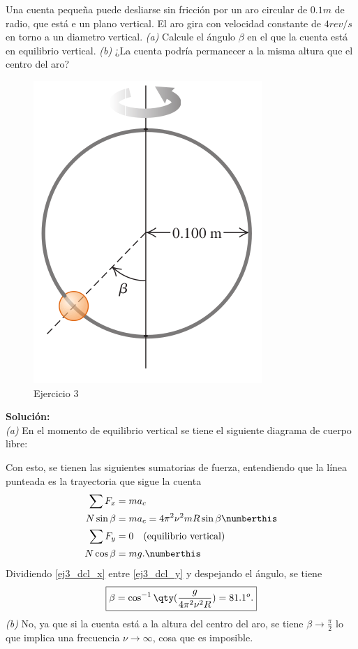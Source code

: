 \begin{mdframed}[style=warning]
	\begin{ejercicio}
		Una cuenta pequeña puede desliarse sin fricción por un aro circular de $0.1m$ de radio, que está e un plano vertical. El aro gira con velocidad constante de $4rev/s$ en torno a un diametro vertical. \textit{(a)} Calcule el ángulo $\beta$ en el que la cuenta está en equilibrio vertical. \textit{(b)} ¿La cuenta podría permanecer a la misma altura que el centro del aro?
		\begin{figure}[H]
			\centering
			\includegraphics[scale=0.35]{./img/5119.png}
			\caption{Ejercicio 3}
			\label{5119}
		\end{figure}
	\end{ejercicio}
	\noindent \textbf{Solución: } \\
	\textit{(a)} En el momento de equilibrio vertical se tiene el siguiente diagrama de cuerpo libre:
	\begin{center}
			
	\end{center}
	Con esto, se tienen las siguientes sumatorias de fuerza, entendiendo que la línea punteada es la trayectoria que sigue la cuenta
	\begin{align*}
		\sum F_x &= ma_c \\
		N\sin{\beta} &= ma_c = 4\pi ^2 \nu ^2 mR\sin{\beta} \numberthis \label{ej3_dcl_x} \\
		\sum F_y &= 0 \quad \text{(equilibrio vertical)} \\
		N\cos{\beta} &= mg. \numberthis \label{ej3_dcl_y}
	\end{align*}
	Dividiendo \eqref{ej3_dcl_x} entre \eqref{ej3_dcl_y} y despejando el ángulo, se tiene
		$$ \boxed{ \beta = \cos ^{-1} {\qty(\frac{g}{4\pi ^2 \nu ^2 R})} = 81.1^o . } $$
	\textit{(b)} No, ya que si la cuenta está a la altura del centro del aro, se tiene $\beta \to \frac{\pi}{2}$ lo que implica una frecuencia $\nu \to \infty$, cosa que es imposible.
\end{mdframed}
